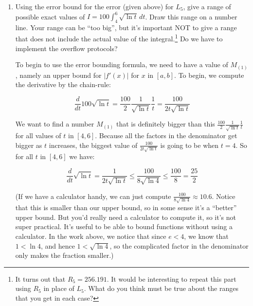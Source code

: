 \documentclass[main]{subfiles}
\begin{document}
\begin{enumerate}
\begin{enumerate}
  \begin{solution}
  The only way to know the exact error is to find the difference between the approximation and the exact value of 
  $I$! Since we have no way to find the exact value of $I$, we couldn't possibly know the exact error.  Another 
  way to think of this is: if you know your approximate value, and you know the exact error, then the sum of 
  these is the exact value!
  \end{solution}

  \item 
  \begin{problem}[1.8in]
  Using the error bound for the error (given above) for $L_{5}$, give a range of possible exact values of $I = 100 \int_{4}^{6} \sqrt{\ln t}\,dt$.  Draw this range on a number line.  Your range can be ``too big'', but it's important NOT to give a range that does not include the actual value of the integral.\footnote{It turns out that $R_{5}=256.191$. It would be interesting to repeat this part using $R_{5}$ in place of $L_{5}$.  What do you think must be true about the ranges that you get in each case?} Do we have to implement the overflow protocols?
  \end{problem}

  \begin{solution}
  To begin to use the error bounding formula, we need to have a value of $M_{(1)}$, namely an upper bound for 
  $|f'(x)|$ for $x$ in $[a,b]$.  To begin, we compute the derivative by the chain-rule:

  $$\frac{d}{dt} 100\sqrt{\ln t} = \frac{100}{2}\frac{1}{\sqrt{\ln t}}\frac{1}{t} = \frac{100}{2 t \sqrt{\ln t}}$$

  We want to find a number $M_{(1)}$ that is definitely bigger than this $\frac{100}{2}\frac{1}{\sqrt{\ln 
  t}}\frac{1}{t}$ for all values of $t$ in $[4,6]$.  Because all the factors in the denominator get bigger as $t$ 
  increases, the biggest value of $\frac{100}{2 t \sqrt{\ln t}}$ is going to be when $t=4$.  So for all $t$ in 
  $[4,6]$ we have:

  $$\frac{d}{dt} \sqrt{\ln t} = \frac{1}{2 t \sqrt{\ln t}} \leq   \frac{100}{8 \sqrt{\ln 4}} \le \frac{100}{8} = \frac{25}{2}$$

  (If we have a calculator handy, we can just compute $\frac{100}{8\sqrt{\ln{4}}} \approx 10.6$.  Notice that this 
  is smaller than our upper bound, so in some sense it's a ``better'' upper bound.  But you'd really need a 
  calculator to compute it, so it's not super practical. It's useful to be able to bound functions without using a 
  calculator.  In the work above, we notice that since $e<4$, we know that $1<\ln 4$, and hence $1<\sqrt{\ln 4}$, 
  so the complicated factor in the denominator only makes the fraction smaller.)


\end{solution}
\end{enumerate}
\end{enumerate}
\end{document}
